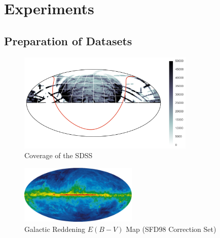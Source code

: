 

\chapter{Experiments}
\label{cha:results}

\section{Preparation of Datasets}
\label{sec:why2}


\begin{figure}[tbp]
	\centering
	\includegraphics[width=0.75\textwidth]{figures/map_prediction_forest_all}
	\caption{Coverage of the SDSS}
	\label{fig:coverage}
\end{figure}

\begin{figure}[tbp]
	\centering
	\includegraphics[width=0.5\textwidth]{figures/galactic_reddening_ebv_map_sfd98}
	\caption{Galactic Reddening $E(B-V)$ Map (SFD98 Correction Set)}
	\label{fig:reddining}
\end{figure}




